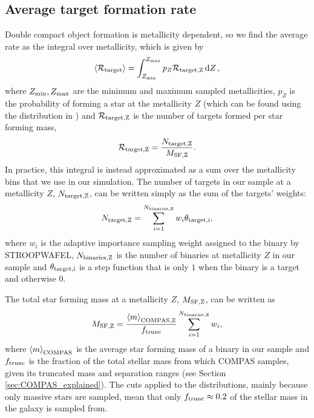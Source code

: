 \subsection{Average target formation rate}
Double compact object formation is metallicity dependent, so we find the average rate as the integral over metallicity, which is given by
\begin{equation}\label{eq:norm_avg_target_formation}
    \avg{ \mathcal{R}_{\rm target} } = \int_{Z_{\rm min}}^{Z_{\rm max}} p_{Z} \mathcal{R}_{\rm target, Z} \dd{Z},
\end{equation}
where $Z_{\rm min}, Z_{\rm max}$ are the minimum and maximum sampled metallicities, $p_Z$ is the probability of forming a star at the metallicity $Z$ (which can be found using the distribution in \citealp{Frankel+2018}) and $\mathcal{R}_{\rm target, Z}$ is the number of targets formed per star forming mass,
\begin{equation}
    \mathcal{R}_{\rm target, Z} =  \frac{N_{\rm target, Z}}{ M_{\rm SF, Z} }.
\end{equation}
In practice, this integral is instead approximated as a sum over the metallicity bins that we use in our simulation. The number of targets in our sample at a metallicity $Z$, $N_{\rm target, Z}$, can be written simply as the sum of the targets' weights:
\begin{equation}
    N_{\rm target, Z} = \sum_{i=1}^{N_{\rm binaries, Z}} w_i \theta_{\rm target, i},
\end{equation}
where $w_i$ is the adaptive importance sampling weight assigned to the binary by STROOPWAFEL, $N_{\rm binaries, Z}$ is the number of binaries at metallicity $Z$ in our sample and $\theta_{\rm target, i}$ is a step function that is only $1$ when the binary is a target and otherwise $0$.

The total star forming mass at a metallicity $Z$, $M_{\rm SF, Z}$, can be written as
\begin{equation}
    M_{\rm SF, Z} = \frac{\avg{m}_{\rm COMPAS, Z}}{f_{\rm trunc}} \sum_{i=1}^{N_{\rm binaries, Z}} w_i,
\end{equation}
where $\left\langle m\right\rangle_{\rm COMPAS}$ is the average star forming mass of a binary in our sample and $f_{\rm trunc}$ is the fraction of the total stellar mass from which COMPAS samples, given its truncated mass and separation ranges (see Section \ref{sec:COMPAS_explained}). The cuts applied to the distributions, mainly because only massive stars are sampled, mean that only $f_{\rm trunc} \approx 0.2$ of the stellar mass in the galaxy is sampled from.

